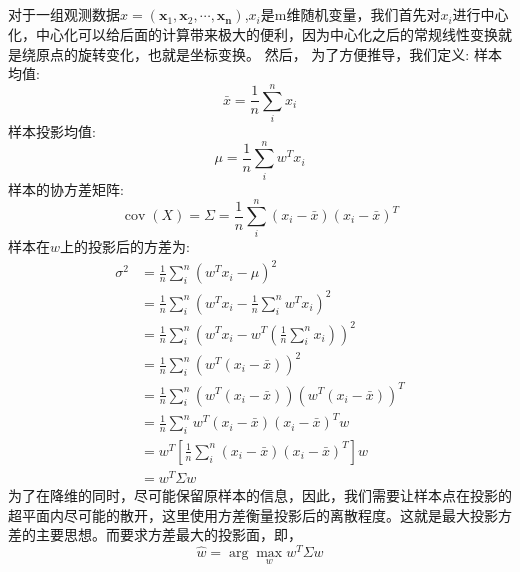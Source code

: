 \documentclass[lang=cn,a4paper,cite=authoryear]{elegantpaper}
\begin{document}
\subsection*{}
对于一组观测数据$x=\left( \boldsymbol{x}_1,\boldsymbol{x}_2,\cdots ,\boldsymbol{x}_{\boldsymbol{n}} \right)$,$x_i$是m维随机变量，我们首先对$x_i$进行中心化，中心化可以给后面的计算带来极大的便利，因为中心化之后的常规线性变换就是绕原点的旋转变化，也就是坐标变换。
然后， 为了方便推导，我们定义:
样本均值:
\begin{equation}
	\bar{x}=\frac{1}{n} \sum_{i}^{n} x_{i}
\end{equation}
样本投影均值:
\begin{equation}
	\mu=\frac{1}{n} \sum_{i}^{n} w^{T} x_{i}
\end{equation}
样本的协方差矩阵:
\begin{equation}
	\operatorname{cov}(X)=\Sigma=\frac{1}{n} \sum_{i}^{n}\left(x_{i}-\bar{x}\right)\left(x_{i}-\bar{x}\right)^{T}
\end{equation}
样本在$w$上的投影后的方差为:
\begin{equation}
	\begin{aligned}
		\sigma^{2} &=\frac{1}{n} \sum_{i}^{n}\left(w^{T} x_{i}-\mu\right)^{2} \\
		&=\frac{1}{n} \sum_{i}^{n}\left(w^{T} x_{i}-\frac{1}{n} \sum_{i}^{n} w^{T} x_{i}\right)^{2} \\
		&=\frac{1}{n} \sum_{i}^{n}\left(w^{T} x_{i}-w^{T}\left(\frac{1}{n} \sum_{i}^{n} x_{i}\right)\right)^{2} \\
		&=\frac{1}{n} \sum_{i}^{n}\left(w^{T}\left(x_{i}-\bar{x}\right)\right)^{2} \\
		&=\frac{1}{n} \sum_{i}^{n}\left(w^{T}\left(x_{i}-\bar{x}\right)\right)\left(w^{T}\left(x_{i}-\bar{x}\right)\right)^{T} \\
		&=\frac{1}{n} \sum_{i}^{n} w^{T}\left(x_{i}-\bar{x}\right)\left(x_{i}-\bar{x}\right)^{T} w \\
		&=w^{T}\left[\frac{1}{n} \sum_{i}^{n}\left(x_{i}-\bar{x}\right)\left(x_{i}-\bar{x}\right)^{T}\right] w \\
		&=w^{T} \Sigma w
	\end{aligned}
\end{equation}
为了在降维的同时，尽可能保留原样本的信息，因此，我们需要让样本点在投影的超平面内尽可能的散开，这里使用方差衡量投影后的离散程度。这就是最大投影方差的主要思想。而要求方差最大的投影面，即，
\begin{equation}
	\hat{w}=\arg \max _{w} w^{T} \Sigma w
\end{equation}
\end{document}
